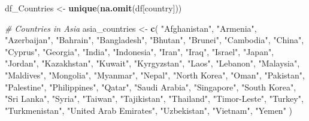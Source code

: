 \documentclass[
]{article}
\newenvironment{Shaded}{\begin{snugshade}}{\end{snugshade}}
\newcommand{\CommentTok}[1]{\textcolor[rgb]{0.56,0.35,0.01}{\textit{#1}}}
\newcommand{\FunctionTok}[1]{\textcolor[rgb]{0.13,0.29,0.53}{\textbf{#1}}}
\newcommand{\NormalTok}[1]{#1}
\newcommand{\OtherTok}[1]{\textcolor[rgb]{0.56,0.35,0.01}{#1}}
\newcommand{\StringTok}[1]{\textcolor[rgb]{0.31,0.60,0.02}{#1}}
\begin{document}
\begin{Shaded}
\begin{Highlighting}[]
\NormalTok{df\_Countries }\OtherTok{\textless{}{-}} \FunctionTok{unique}\NormalTok{(}\FunctionTok{na.omit}\NormalTok{(df[}\StringTok{\textquotesingle{}country\textquotesingle{}}\NormalTok{]))}
\end{Highlighting}
\end{Shaded}

\begin{Shaded}
\begin{Highlighting}[]
\CommentTok{\# Countries in Asia}
\NormalTok{asia\_countries }\OtherTok{\textless{}{-}} \FunctionTok{c}\NormalTok{(}
  \StringTok{"Afghanistan"}\NormalTok{, }\StringTok{"Armenia"}\NormalTok{, }\StringTok{"Azerbaijan"}\NormalTok{, }\StringTok{"Bahrain"}\NormalTok{, }\StringTok{"Bangladesh"}\NormalTok{, }\StringTok{"Bhutan"}\NormalTok{, }
  \StringTok{"Brunei"}\NormalTok{, }\StringTok{"Cambodia"}\NormalTok{, }\StringTok{"China"}\NormalTok{, }\StringTok{"Cyprus"}\NormalTok{, }\StringTok{"Georgia"}\NormalTok{, }\StringTok{"India"}\NormalTok{, }\StringTok{"Indonesia"}\NormalTok{, }
  \StringTok{"Iran"}\NormalTok{, }\StringTok{"Iraq"}\NormalTok{, }\StringTok{"Israel"}\NormalTok{, }\StringTok{"Japan"}\NormalTok{, }\StringTok{"Jordan"}\NormalTok{, }\StringTok{"Kazakhstan"}\NormalTok{, }\StringTok{"Kuwait"}\NormalTok{, }
  \StringTok{"Kyrgyzstan"}\NormalTok{, }\StringTok{"Laos"}\NormalTok{, }\StringTok{"Lebanon"}\NormalTok{, }\StringTok{"Malaysia"}\NormalTok{, }\StringTok{"Maldives"}\NormalTok{, }\StringTok{"Mongolia"}\NormalTok{, }
  \StringTok{"Myanmar"}\NormalTok{, }\StringTok{"Nepal"}\NormalTok{, }\StringTok{"North Korea"}\NormalTok{, }\StringTok{"Oman"}\NormalTok{, }\StringTok{"Pakistan"}\NormalTok{, }\StringTok{"Palestine"}\NormalTok{, }
  \StringTok{"Philippines"}\NormalTok{, }\StringTok{"Qatar"}\NormalTok{, }\StringTok{"Saudi Arabia"}\NormalTok{, }\StringTok{"Singapore"}\NormalTok{, }\StringTok{"South Korea"}\NormalTok{, }
  \StringTok{"Sri Lanka"}\NormalTok{, }\StringTok{"Syria"}\NormalTok{, }\StringTok{"Taiwan"}\NormalTok{, }\StringTok{"Tajikistan"}\NormalTok{, }\StringTok{"Thailand"}\NormalTok{, }\StringTok{"Timor{-}Leste"}\NormalTok{, }
  \StringTok{"Turkey"}\NormalTok{, }\StringTok{"Turkmenistan"}\NormalTok{, }\StringTok{"United Arab Emirates"}\NormalTok{, }\StringTok{"Uzbekistan"}\NormalTok{, }
  \StringTok{"Vietnam"}\NormalTok{, }\StringTok{"Yemen"}
\NormalTok{)}


\end{Highlighting}
\end{Shaded}
\end{document}
